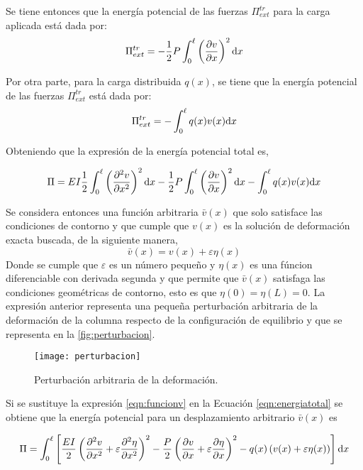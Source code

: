 Se tiene entonces que la energía potencial de las fuerzas $\Pi^{tr}_{ext}$ para la carga aplicada está dada por:
\begin{equation}
\Pi_{ext}^{tr} = -\frac{1}{2} P \int_0^\ell  \left(\frac{\partial v}{\partial x}\right)^2 {\text{d}} x
\end{equation}

Por otra parte, para la carga distribuida $q(x)$, se tiene que la energía potencial de las fuerzas $\Pi^{tr}_{ext}$ está dada por:
\begin{equation}
\Pi_{ext}^{tr} =
- \int_0^\ell q(x) v(x) {\text{d}} x
\end{equation}

Obteniendo que la expresión de la energía potencial total es,

\begin{equation}\label{eqn:energiatotal}
\Pi = E I \frac{1}{2} \int_0^\ell \left( \frac{\partial^2 v}{\partial x^2}\right)^2 {\text{d}} x -\frac{1}{2} P \int_0^\ell  \left(\frac{\partial v}{\partial x}\right)^2 {\text{d}} x - \int_0^\ell q(x) v(x) {\text{d}} x
\end{equation}

Se considera entonces una función arbitraria $\bar{v}(x)$ que solo satisface las condiciones de contorno y que cumple que $v(x)$ es la solución de deformación exacta buscada, de la siguiente manera,
\begin{equation}\label{eqn:funcionv}
\bar{v}(x)=v(x)+\varepsilon\eta(x)
\end{equation}
Donde se cumple que $\varepsilon$ es un número pequeño y $\eta(x)$ es una fúncion diferenciable con derivada segunda y que permite que $\bar{v}(x)$ satisfaga las condiciones geométricas de contorno, esto es que $\eta(0)=\eta(L)=0$.
La expresión anterior representa una pequeña perturbación arbitraria de la deformación de la columna respecto de la configuración de equilibrio y que se representa en la \autoref{fig:perturbacion}.

\begin{figure}[htb]
	\centering
	\texttt{[image: perturbacion]}
	\caption{Perturbación arbitraria de la deformación.}
	\label{fig:perturbacion}
\end{figure}

Si se sustituye la expresión \eqref{eqn:funcionv} en la Ecuación \eqref{eqn:energiatotal} se obtiene que la energía potencial para un desplazamiento arbitrario $\bar{v}(x)$ es

\begin{equation}\label{eqn:energiatotal2}
\Pi = \int_0^\ell \left[ \frac{EI}{2} \left( \frac{\partial^2 v}{\partial x^2} + \varepsilon\frac{\partial^2 \eta}{\partial x^2} \right)^2 - \frac{P}{2} \left(\frac{\partial v}{\partial x} + \varepsilon\frac{\partial \eta}{\partial x}\right)^2- q(x) \left( v(x)+\varepsilon\eta(x)\right) \right] {\text{d}} x
\end{equation}

